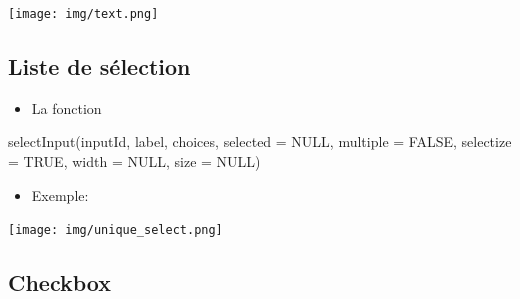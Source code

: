 \documentclass[
]{article}
\newenvironment{Shaded}{\begin{snugshade}}{\end{snugshade}}
\newcommand{\AttributeTok}[1]{\textcolor[rgb]{0.77,0.63,0.00}{#1}}
\newcommand{\CommentTok}[1]{\textcolor[rgb]{0.56,0.35,0.01}{\textit{#1}}}
\newcommand{\ConstantTok}[1]{\textcolor[rgb]{0.00,0.00,0.00}{#1}}
\newcommand{\DecValTok}[1]{\textcolor[rgb]{0.00,0.00,0.81}{#1}}
\newcommand{\FunctionTok}[1]{\textcolor[rgb]{0.00,0.00,0.00}{#1}}
\newcommand{\NormalTok}[1]{#1}
\newcommand{\OtherTok}[1]{\textcolor[rgb]{0.56,0.35,0.01}{#1}}
\newcommand{\StringTok}[1]{\textcolor[rgb]{0.31,0.60,0.02}{#1}}
\providecommand{\tightlist}{%
  \setlength{\itemsep}{0pt}\setlength{\parskip}{0pt}}
\begin{document}
\texttt{[image: img/text.png]}

\hypertarget{liste-de-suxe9lection}{%
\subsection{Liste de sélection}\label{liste-de-suxe9lection}}

\begin{itemize}
\tightlist
\item
  La fonction
\end{itemize}

\begin{Shaded}
\begin{Highlighting}[]
\FunctionTok{selectInput}\NormalTok{(inputId, label, choices, }\AttributeTok{selected =} \ConstantTok{NULL}\NormalTok{, }\AttributeTok{multiple =} \ConstantTok{FALSE}\NormalTok{,}
            \AttributeTok{selectize =} \ConstantTok{TRUE}\NormalTok{, }\AttributeTok{width =} \ConstantTok{NULL}\NormalTok{, }\AttributeTok{size =} \ConstantTok{NULL}\NormalTok{)}
\end{Highlighting}
\end{Shaded}

\begin{itemize}
\tightlist
\item
  Exemple:
\end{itemize}

\begin{Shaded}
\end{Shaded}

\texttt{[image: img/unique\_select.png]}

\hypertarget{checkbox}{%
\subsection{Checkbox}\label{checkbox}}
\end{document}
